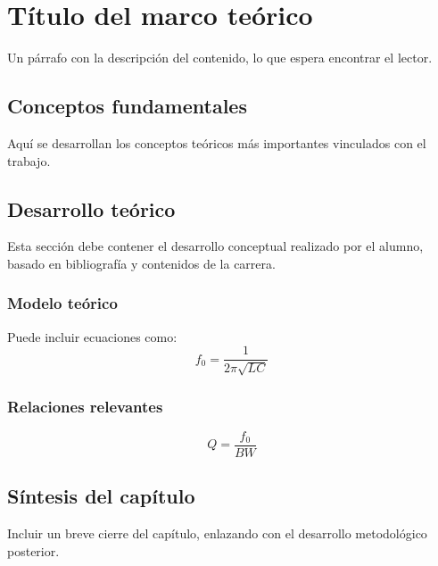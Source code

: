 \chapter{Título del marco teórico}

Un párrafo con la descripción del contenido, lo que espera encontrar el lector.

\section{Conceptos fundamentales}
Aquí se desarrollan los conceptos teóricos más importantes vinculados con el trabajo.

\section{Desarrollo teórico}
Esta sección debe contener el desarrollo conceptual realizado por el alumno, basado en bibliografía y contenidos de la carrera.

\subsection{Modelo teórico}
Puede incluir ecuaciones como:
\begin{equation}
    f_0=\frac{1}{2\pi\sqrt{LC}}
\end{equation}

\subsection{Relaciones relevantes}
\begin{equation}
    Q=\frac{f_0}{BW}
\end{equation}

\section{Síntesis del capítulo}
Incluir un breve cierre del capítulo, enlazando con el desarrollo metodológico posterior.